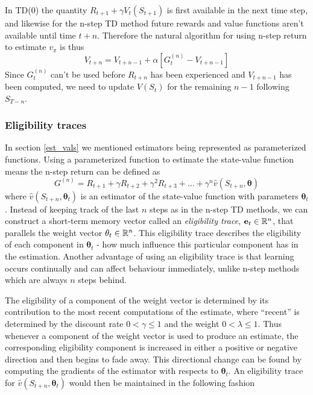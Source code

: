 \documentclass[11pt]{article}
\begin{document}
In TD($0$) the quantity $R_{t+1} + \gamma  V_t(S_{t+1})$ is
first available in the next time step, and likewise for the n-step TD method future rewards
and value functions aren't available until time $t + n$.
Therefore the natural algorithm for using n-step return to estimate $v_\pi$ is thus
\begin{equation}
    V_{t+n} = V_{t+n-1} + \alpha  [G^{(n)}_t - V_{t+n-1}]
\end{equation}
Since $G^{(n)}_t$ can't be used before $R_{t+n}$ has been experienced
and $V_{t+n-1}$ has been computed, we need to update
$V(S_t)$ for the remaining $n - 1$ following $S_{T-n}$.

\subsubsection{Eligibility traces}

In section \ref{est_vals} we mentioned estimators being represented as
parameterized functions.
Using a parameterized function to estimate the state-value function means
the n-step return can be defined as
\begin{equation}
    G^{(n)} = R_{t+1} + \gamma  R_{t+2} + \gamma^2  R_{t+3} + \dots + \gamma^n  \hat{v}(S_{t+n}, \mathbf{\theta})
\end{equation}
where $\hat{v}(S_{t+n}, \mathbf{\theta}_t)$ is an estimator of the
state-value function with parameters $\mathbf{\theta}_t$.
Instead of keeping track of the last $n$ steps as in the n-step TD
methods,
we can construct a short-term memory vector called an \textit{eligibility trace}, $\mathbf{e}_t \in \mathbb{R}^n$,
that parallels the weight vector $\mathbf{\theta}_t \in \mathbb{R}^n$\cite{RLbook}.
This eligibility trace describes the eligibility of each component in $\mathbf{\theta}_t$ -
how much influence this particular component has in the estimation.
Another advantage of using an eligibility trace is that
learning occurs continually and can affect behaviour immediately,
unlike n-step methods which are always $n$ steps behind.

The eligibility of a component of the weight vector is determined
by its contribution to the most recent computations of the estimate,
where “recent” is determined by the discount rate $0 < \gamma \leq 1$ and the weight
$0 < \lambda \leq 1$.
Thus whenever a component of the weight vector
is used to produce an estimate, the corresponding eligibility component
is increased in either a positive or negative direction and then begins to fade away.
This directional change can be found by computing the
gradients of the estimator with respects to $\mathbf{\theta}_t$\cite{RLbook}.
An eligibility trace for $\hat{v}(S_{t+n}, \mathbf{\theta}_t)$ would then
be maintained in the following fashion
\end{document}
